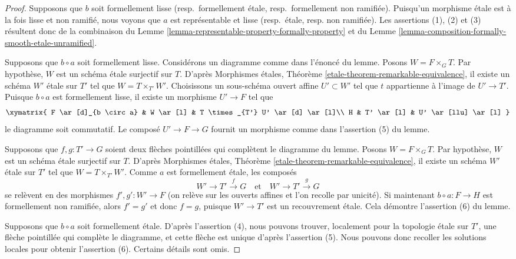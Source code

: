 \begin{proof}
Supposons que $b$ soit formellement lisse (resp.\ formellement étale,
resp.\ formellement non ramifiée). Puisqu'un morphisme étale est à la fois
lisse et non ramifié, nous voyons que $a$ est représentable et lisse
(resp.\ étale, resp. non ramifiée). Les assertions (1), (2) et (3)
résultent donc de la combinaison du
Lemme \ref{lemma-representable-property-formally-property}
et du
Lemme \ref{lemma-composition-formally-smooth-etale-unramified}.

\medskip\noindent
Supposons que $b \circ a$ soit formellement lisse. Considérons un diagramme
comme dans l'énoncé du lemme. Posons $W = F \times_G T$.
Par hypothèse, $W$ est un schéma étale surjectif sur $T$. D'après
Morphismes étales, Théorème \ref{etale-theorem-remarkable-equivalence},
il existe un schéma $W'$ étale sur $T'$ tel que $W = T \times_{T'} W'$.
Choisissons un sous-schéma ouvert affine $U' \subset W'$ tel que $t$ appartienne à
l'image de $U' \to T'$. Puisque $b \circ a$ est formellement
lisse, il existe un morphisme $U' \to F$ tel que
$$
\xymatrix{
F \ar[d]_{b \circ a} & W \ar[l] & T \times_{T'} U' \ar[d] \ar[l]\\
H & T' \ar[l] & U' \ar[llu] \ar[l]
}
$$
le diagramme soit commutatif. Le composé $U' \to F \to G$ fournit un
morphisme comme dans l'assertion (5) du lemme.

\medskip\noindent
Supposons que $f, g : T' \to G$ soient deux flèches pointillées qui complètent le
diagramme du lemme. Posons $W = F \times_G T$.
Par hypothèse, $W$ est un schéma étale surjectif sur $T$. D'après
Morphismes étales, Théorème \ref{etale-theorem-remarkable-equivalence},
il existe un schéma $W'$ étale sur $T'$ tel que $W = T \times_{T'} W'$.
Comme $a$ est formellement étale, les composés
$$
W' \to T' \xrightarrow{f} G
\quad\text{et}\quad
W' \to T' \xrightarrow{g} G
$$
se relèvent en des morphismes $f', g' : W' \to F$ (on relève sur les ouverts affines et l'on recolle par
unicité). Si maintenant $b \circ a : F \to H$ est formellement non ramifiée, alors
$f' = g'$ et donc $f = g$, puisque $W' \to T'$ est un recouvrement étale. Cela démontre
l'assertion (6) du lemme.

\medskip\noindent
Supposons que $b \circ a$ soit formellement étale. D'après l'assertion (4), nous
pouvons trouver, localement pour la topologie étale sur $T'$, une flèche pointillée qui complète le diagramme,
et cette flèche est unique d'après l'assertion (5). Nous pouvons donc recoller les
solutions locales pour obtenir l'assertion (6). Certains détails sont omis.
\end{proof}

